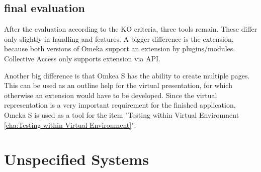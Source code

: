 \subsection{final evaluation}
After the evaluation according to the KO criteria, three tools remain. These differ only slightly in handling and features. A bigger difference is the extension, because both versions of Omeka support an extension by plugins/modules. Collective Access only supports extension via API.

Another big difference is that Omkea S has the ability to create multiple pages. This can be used as an outline help for the virtual presentation, for which otherwise an extension would have to be developed. Since the virtual representation is a very important requirement for the finished application, Omeka S is used as a tool for the item "Testing within Virtual Environment \ref{cha:Testing within Virtual Environment}".

\section{Unspecified Systems}

